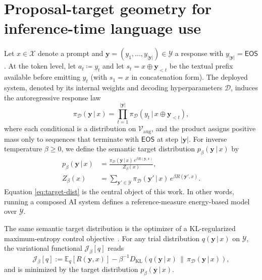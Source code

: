 \documentclass[aps,pre,reprint,superscriptaddress,nofootinbib]{revtex4-2}
\newcommand{\E}{\mathbb{E}}
\newcommand{\KL}{D_{\mathrm{KL}}}
\newcommand{\given}{\,|\,}
\newcommand{\eos}{\mathsf{EOS}}
\newcommand{\cX}{\mathcal{X}}
\newcommand{\cY}{\mathcal{Y}}
\newcommand{\augvoc}{\mathcal{V}_{\mathrm{aug}}}
\newcommand{\y}{\mathbf{y}}
\begin{document}
\section{Proposal-target geometry for inference-time language use}

Let $x \in \cX$ denote a prompt and $\y=(y_1,\ldots,y_{|\y|}) \in \cY$ a response with $y_{|\y|}=\eos$.
At the token level, let $a_t \coloneqq y_t$ and let $s_t = x \oplus \y_{<t}$ be the textual prefix available before emitting $y_t$ (with $s_1=x$ in concatenation form).
The deployed system, denoted by its internal weights and decoding hyperparameters $\mathcal D$, induces the autoregressive response law
\begin{equation}
\pi_{\mathcal D}(\y \given x) = \prod_{t=1}^{|\y|} \pi_{\mathcal D}\!\left(y_t \given x \oplus \y_{<t}\right),
\label{eq:proposal-factorization}
\end{equation}
where each conditional is a distribution on $\augvoc$, and the product assigns positive mass only to sequences that terminate with $\eos$ at step $|\y|$.
For inverse temperature $\beta \ge 0$, we define the semantic target distribution $p_\beta(\y \given x)$ by
\begin{equation}
\begin{aligned}
p_\beta(\y \given x) &= \frac{\pi_{\mathcal D}(\y \given x)\,e^{\beta R(\y,x)}}{Z_\beta(x)}, \\
Z_\beta(x) &= \sum_{\y' \in \cY}\pi_{\mathcal D}(\y' \given x)\,e^{\beta R(\y',x)}.
\end{aligned}
\label{eq:target-dist}
\end{equation}
Equation \eqref{eq:target-dist} is the central object of this work.
In other words, running a composed AI system defines a reference-measure energy-based model over $\cY$.

The same semantic target distribution is the optimizer of a KL-regularized maximum-entropy control objective~\cite{ziebart2008maximum}. 
For any trial distribution $q(\y\given x)$ on $\cY$, the variational functional $\mathcal J_\beta[q]$ reads
\begin{equation}
\mathcal J_\beta[q] := \E_{q}\!\left[R(\y,x)\right] -\beta^{-1}\KL\!\left(q(\y\given x)\,\|\,\pi_{\mathcal D}(\y\given x)\right),
\label{eq:variational-objective}
\end{equation}
and is minimized by the target distribution $p_\beta(\y\given x)$.
\end{document}
